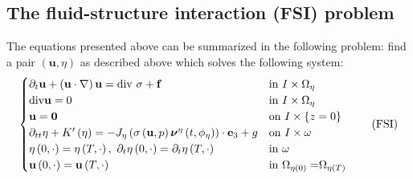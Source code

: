 \documentclass[10pt,a4paper]{article}
\numberwithin{equation}{section}
\begin{document}
\subsection{The fluid-structure interaction (FSI) problem} 
The equations presented above can be summarized in the following problem:
find a pair $\left(\mathbf{u},\eta\right)$ as described above which  solves the following system: 
\begin{equation}\label{eqn:FSI-system}
\begin{cases}
\partial_{t}\mathbf{u}+\left(\mathbf{u}\cdot\nabla\right)\mathbf{u}=\text{div}\ \sigma+\mathbf{f} & \text{in}\ I\times\Omega_{\eta}\\
\text{div}\mathbf{u}=0 & \text{in}\ I\times\Omega_{\eta}\\
\mathbf{u}=\mathbf{0} & \text{on}\ I\times\left\{ z=0\right\} \\
\partial_{tt}\eta+K^{\prime}\left(\eta\right)=-J_{\eta}\left(\sigma\left(\mathbf{u},p\right)\boldsymbol{\nu}^{\eta}\left(t,\phi_{\eta}\right)\right)\cdot\mathbf{e}_{3}+g & \text{on}\ I\times\omega\\
\eta\left(0,\cdot\right)=\eta\left(T,\cdot\right),\ \partial_{t}\eta\left(0,\cdot\right)=\partial_{t}\eta\left(T,\cdot\right) & \text{in}\ \omega\\
\mathbf{u}\left(0,\cdot\right)=\mathbf{u}\left(T,\cdot\right) & \text{in \ensuremath{\Omega_{\eta\left(0\right)}=}\ensuremath{\Omega_{\eta\left(T\right)}}}
\end{cases}\tag{FSI}
\end{equation}
\end{document}
